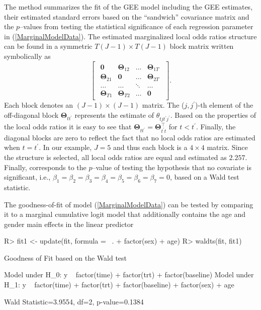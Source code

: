 \documentclass[
]{jss}
\begin{document}
The  method summarizes the fit of the GEE model including
the GEE estimates, their estimated standard errors based on the
``sandwich'' covariance matrix and the \(p\)--values from testing the
statistical significance of each regression parameter in
(\ref{MarginalModelData}). The estimated marginalized local odds ratios
structure can be found in a symmetric \(T(J-1) \times T(J-1)\) block
matrix written symbolically as \[\begin{bmatrix}
\begin{array}{cccc}
\mathbf 0                               &\boldsymbol{\Theta}_{12}                 &\ldots  &\boldsymbol{\Theta}_{1T} \\
\boldsymbol{\Theta}_{21}       &\mathbf 0                                &\ldots  &\boldsymbol{\Theta}_{2T} \\
\ldots                                  &\ldots                                   &\ddots  & \ldots          \\
\boldsymbol{\Theta}_{T1}       &\boldsymbol{\Theta}_{T2}        &\ldots  &\mathbf 0
\end{array}
\end{bmatrix}.\] Each block denotes an \((J-1) \times (J-1)\) matrix.
The (\(j,j^{\prime}\))-th element of the off-diagonal block
\(\boldsymbol{\Theta}_{tt^{\prime}}\) represents the estimate of
\(\theta_{tjt^{\prime}j^{\prime}}\). Based on the properties of the
local odds ratios it is easy to see that
\(\boldsymbol{\Theta}_{tt^{\prime}}=\boldsymbol{\Theta}^{\top}_{t^{\prime}t}\)
for \(t<t^{\prime}\). Finally, the diagonal blocks are zero to reflect
the fact that no local odds ratios are estimated when \(t=t^{\prime}\).
In our example, \(J=5\) and thus each block is a \(4 \times 4\) matrix.
Since the  structure is selected, all local odds ratios
are equal and estimated as \(2.257\). Finally,
 corresponds to the \(p\)--value of testing
the hypothesis that no covariate is significant, i.e.,
\(\beta_1=\beta_2=\beta_3=\beta_4 =\beta_5=\beta_6=\beta_7=0\), based on
a Wald test statistic.

The goodness-of-fit of model (\ref{MarginalModelData}) can be tested by
comparing it to a marginal cumulative logit model that additionally
contains the age and gender main effects in the linear predictor

\begin{CodeChunk}

\begin{CodeInput}
R> fit1 <- update(fit, formula = ~. + factor(sex) + age)
R> waldts(fit, fit1)
\end{CodeInput}

\begin{CodeOutput}
Goodness of Fit based on the Wald test 

Model under H_0: y ~ factor(time) + factor(trt) + factor(baseline)
Model under H_1: y ~ factor(time) + factor(trt) + factor(baseline) + factor(sex) + 
    age

Wald Statistic=3.9554, df=2, p-value=0.1384
\end{CodeOutput}
\end{CodeChunk}
\end{document}
